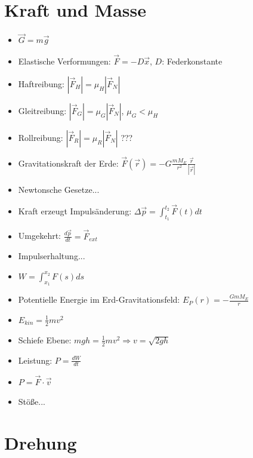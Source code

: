\documentclass[a4paper,10pt, fleqn]{article}
\begin{document}
\section{Kraft und Masse}
\label{sec:kraft-und-masse}

\begin{itemize}
\item $\vec{G} = m\vec{g}$
\item Elastische Verformungen: $\vec{F} = -D\vec{x}$, $D$: Federkonstante
\item Haftreibung: $|\vec{F}_H| = \mu_H |\vec{F}_N|$
\item Gleitreibung: $|\vec{F}_G| = \mu_G |\vec{F}_N|$, $\mu_G < \mu_H$
\item Rollreibung: $|\vec{F}_R| = \mu_R |\vec{F}_N|$ ???
\item Gravitationskraft der Erde: $\vec{F}(\vec{r}) = -G\frac{mM_E}{r^2} \frac{\vec{r}}{|\vec{r}|}$
\item Newtonsche Gesetze...
\item Kraft erzeugt Impulsänderung: $\Delta \vec{p} = \int_{t_1}^{t_2}\vec{F}(t)dt$
\item Umgekehrt: $\frac{d\vec{p}}{dt} = \vec{F}_{ext}$
\item Impulserhaltung...
\item $W = \int_{x_1}^{x_2}F(s)ds$
\item Potentielle Energie im Erd-Gravitationsfeld: $E_P(r) = -\frac{GmM_E}{r}$
\item $E_{kin} = \frac{1}{2}mv^2$
\item Schiefe Ebene: $mgh = \frac{1}{2}mv^2 \Rightarrow v = \sqrt{2gh}$
\item Leistung: $P = \frac{dW}{dt}$
\item $P = \vec{F} \cdot \vec{v}$
\item Stöße...
\end{itemize}

\section{Drehung}
\label{sec:drehung}
\end{document}
